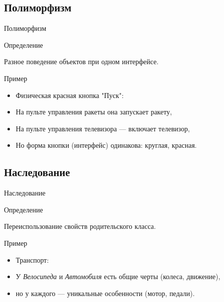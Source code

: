 \documentclass{beamer}
\newenvironment{rusdefinition}[1][Определение]{
    \begin{block}{#1}
}{\end{block}}
\newenvironment{rexample}[1][Пример]{\begin{exampleblock}{#1}}{\end{exampleblock}}
\begin{document}
\subsection{Полиморфизм}
\begin{frame}{Полиморфизм}
\begin{rusdefinition}
Разное поведение объектов при одном интерфейсе. 
\end{rusdefinition}
\begin{rexample}
    \begin{itemize}
    \item Физическая красная кнопка "Пуск":
    \item На пульте управления ракеты она запускает ракету,
    \item На пульте управления телевизора — включает телевизор,
    \item Но форма кнопки (интерфейс) одинакова: круглая, красная.
\end{itemize}
\end{rexample}
\end{frame}

\subsection{Наследование}
\begin{frame}{Наследование}
    \begin{rusdefinition}
    Переиспользование свойств родительского класса. 
\end{rusdefinition}
\begin{rexample}
    \begin{itemize}
        \item Транспорт: 
        \item У \textit{Велосипеда} и \textit{Автомобиля} есть общие черты (колеса, движение),
        \item но у каждого — уникальные особенности (мотор, педали).
    \end{itemize}
\end{rexample}
\end{frame}
\end{document}
